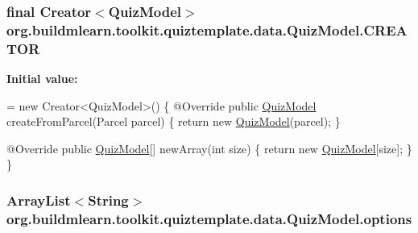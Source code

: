 \subsubsection[{\texorpdfstring{C\+R\+E\+A\+T\+OR}{CREATOR}}]{\setlength{\rightskip}{0pt plus 5cm}final Creator$<${\bf Quiz\+Model}$>$ org.\+buildmlearn.\+toolkit.\+quiztemplate.\+data.\+Quiz\+Model.\+C\+R\+E\+A\+T\+OR\hspace{0.3cm}{\ttfamily [static]}}\hypertarget{classorg_1_1buildmlearn_1_1toolkit_1_1quiztemplate_1_1data_1_1QuizModel_a54ebe675c8f3dc6df679f60c65f703cc}{}\label{classorg_1_1buildmlearn_1_1toolkit_1_1quiztemplate_1_1data_1_1QuizModel_a54ebe675c8f3dc6df679f60c65f703cc}
{\bfseries Initial value\+:}
\begin{DoxyCode}
= \textcolor{keyword}{new} Creator<QuizModel>() \{
        @Override
        \textcolor{keyword}{public} \hyperlink{classorg_1_1buildmlearn_1_1toolkit_1_1quiztemplate_1_1data_1_1QuizModel_a4d6c8f745dbaafa8f0210a5d36916545}{QuizModel} createFromParcel(Parcel parcel) \{
            \textcolor{keywordflow}{return} \textcolor{keyword}{new} \hyperlink{classorg_1_1buildmlearn_1_1toolkit_1_1quiztemplate_1_1data_1_1QuizModel_a4d6c8f745dbaafa8f0210a5d36916545}{QuizModel}(parcel);
        \}

        @Override
        \textcolor{keyword}{public} \hyperlink{classorg_1_1buildmlearn_1_1toolkit_1_1quiztemplate_1_1data_1_1QuizModel_a4d6c8f745dbaafa8f0210a5d36916545}{QuizModel}[] newArray(\textcolor{keywordtype}{int} size) \{
            \textcolor{keywordflow}{return} \textcolor{keyword}{new} \hyperlink{classorg_1_1buildmlearn_1_1toolkit_1_1quiztemplate_1_1data_1_1QuizModel_a4d6c8f745dbaafa8f0210a5d36916545}{QuizModel}[size];
        \}
    \}
\end{DoxyCode}
\subsubsection[{\texorpdfstring{options}{options}}]{\setlength{\rightskip}{0pt plus 5cm}Array\+List$<$String$>$ org.\+buildmlearn.\+toolkit.\+quiztemplate.\+data.\+Quiz\+Model.\+options\hspace{0.3cm}{\ttfamily [private]}}\hypertarget{classorg_1_1buildmlearn_1_1toolkit_1_1quiztemplate_1_1data_1_1QuizModel_a33236011db95b7a1abea3b71d17df01b}{}\label{classorg_1_1buildmlearn_1_1toolkit_1_1quiztemplate_1_1data_1_1QuizModel_a33236011db95b7a1abea3b71d17df01b}
